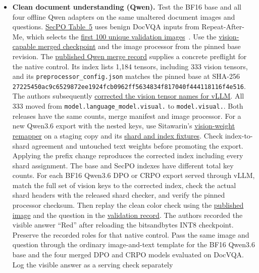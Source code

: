 \documentclass[11pt]{article}
\begin{document}
\begin{itemize}
\item \textbf{Clean document understanding (Qwen).} Test the BF16 base and all four offline Qwen adapters on the same unaltered document images and questions. \href{https://arxiv.org/html/2610.41998v1#S4.SS5}{SecPO Table~5} uses benign DocVQA inputs from Repeat-After-Me, which selects the \href{https://arxiv.org/html/2609.04533v1}{first 100 unique validation images} \cite[Sec.~4.5]{chen2026secpo}\,\cite{chen2026repeat}. Use the \href{https://github.com/Sizhe-Chen/SecPO/blob/da0372a0e598badf4e51c98c175a962147cac2ac/src/secpo/model_merge_qwen36.py}{vision-capable merged checkpoint} and the image processor from the pinned base revision. The \href{https://huggingface.co/Sizhe-Chen/Qwen3.6-27B-Instruct-SecPO/blob/726da6ba0f153d478c207dd5edc593e18e7fd513/merge_manifest.json}{published Qwen merge record} supplies a concrete preflight for the native control. Its index lists 1,184 tensors, including 333 vision tensors, and its \texttt{preprocessor\_config.json} matches the pinned base at SHA-256 {\small\texttt{2722\allowbreak{}5450\allowbreak{}ac9c\allowbreak{}6529\allowbreak{}872e\allowbreak{}e192\allowbreak{}4fcb\allowbreak{}0962\allowbreak{}ff56\allowbreak{}3483\allowbreak{}4f81\allowbreak{}7040\allowbreak{}f444\allowbreak{}1181\allowbreak{}16f4\allowbreak{}e516}}. The authors subsequently \href{https://huggingface.co/Sizhe-Chen/Qwen3.6-27B-Instruct-SecPO/commit/51bd0e76a741defb749be4a973f20d1c1d6ada5c}{corrected the vision tensor names for vLLM}. All 333 moved from \texttt{model.language\_model.visual.} to \texttt{model.visual.}. Both releases have the same counts, merge manifest and image processor. For a new Qwen3.6 export with the nested keys, use Sitawarin's \href{https://github.com/chawins/agentdojo/blob/07e5ed5d6039571eb7b5bda683143ebd2666e1b7/scripts/qwen3_6_eval/merge_lora.py#L75-L136}{vision-weight remapper} on a staging copy and its \href{https://github.com/chawins/agentdojo/blob/07e5ed5d6039571eb7b5bda683143ebd2666e1b7/tests/scripts/test_qwen3_6_eval.py#L178-L279}{shard and index fixtures}. Check index-to-shard agreement and untouched text weights before promoting the export. Applying the prefix change reproduces the corrected index including every shard assignment. The base and SecPO indexes have different total key counts. For each BF16 Qwen3.6 DPO or CRPO export served through vLLM, match the full set of vision keys to the corrected index, check the actual shard headers with the released shard checker, and verify the pinned processor checksum. Then replay the clean color check using the \href{https://huggingface.co/Sizhe-Chen/Qwen3.6-27B-Instruct-SecPO-8Bit/blob/8674c489dda144c51441b5a75cfb7cfd2f7d49f8/vision_smoke_red.png}{published image} and the question in the \href{https://huggingface.co/Sizhe-Chen/Qwen3.6-27B-Instruct-SecPO-8Bit/blob/8674c489dda144c51441b5a75cfb7cfd2f7d49f8/validation_results.json}{validation record}. The authors recorded the visible answer ``Red'' after reloading the bitsandbytes INT8 checkpoint. Preserve the recorded roles for that native control. Pass the same image and question through the ordinary image-and-text template for the BF16 Qwen3.6 base and the four merged DPO and CRPO models evaluated on DocVQA. Log the visible answer as a serving check separately 
\end{itemize}
\end{document}
